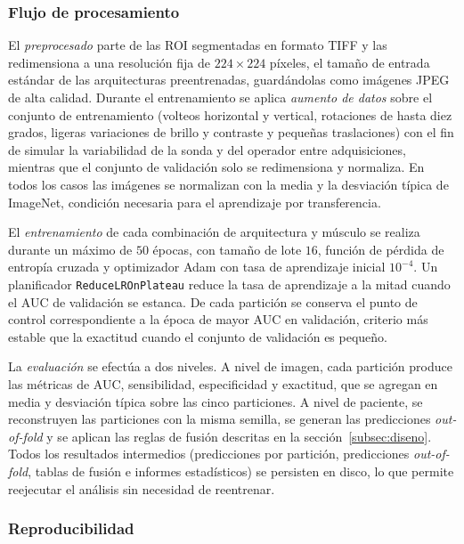 \documentclass[12pt]{extarticle}
\numberwithin{equation}{section}
\begin{document}
\begin{refsection}
\subsubsection{Flujo de procesamiento}

El \textit{preprocesado} parte de las ROI segmentadas en formato TIFF y las redimensiona a una resolución fija de $224 \times 224$ píxeles, el tamaño de entrada estándar de las arquitecturas preentrenadas, guardándolas como imágenes JPEG de alta calidad. Durante el entrenamiento se aplica \textit{aumento de datos} sobre el conjunto de entrenamiento (volteos horizontal y vertical, rotaciones de hasta diez grados, ligeras variaciones de brillo y contraste y pequeñas traslaciones) con el fin de simular la variabilidad de la sonda y del operador entre adquisiciones, mientras que el conjunto de validación solo se redimensiona y normaliza. En todos los casos las imágenes se normalizan con la media y la desviación típica de ImageNet, condición necesaria para el aprendizaje por transferencia.

El \textit{entrenamiento} de cada combinación de arquitectura y músculo se realiza durante un máximo de $50$ épocas, con tamaño de lote $16$, función de pérdida de entropía cruzada y optimizador Adam con tasa de aprendizaje inicial $10^{-4}$. Un planificador \texttt{Reduce\allowbreak LROn\allowbreak Plateau} reduce la tasa de aprendizaje a la mitad cuando el AUC de validación se estanca. De cada partición se conserva el punto de control correspondiente a la época de mayor AUC en validación, criterio más estable que la exactitud cuando el conjunto de validación es pequeño.

La \textit{evaluación} se efectúa a dos niveles. A nivel de imagen, cada partición produce las métricas de AUC, sensibilidad, especificidad y exactitud, que se agregan en media y desviación típica sobre las cinco particiones. A nivel de paciente, se reconstruyen las particiones con la misma semilla, se generan las predicciones \textit{out-of-fold} y se aplican las reglas de fusión descritas en la sección~\ref{subsec:diseno}. Todos los resultados intermedios (predicciones por partición, predicciones \textit{out-of-fold}, tablas de fusión e informes estadísticos) se persisten en disco, lo que permite reejecutar el análisis sin necesidad de reentrenar.

\subsubsection{Reproducibilidad}


\end{refsection}
\end{document}
